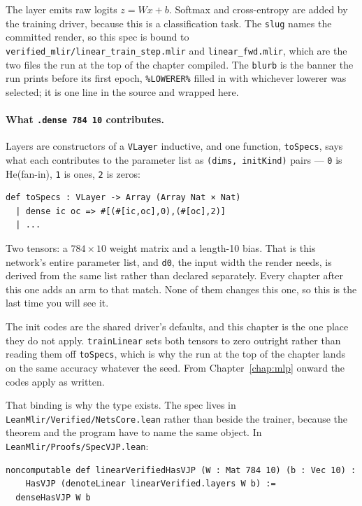The layer emits raw logits \(z = W x + b\). Softmax and cross-entropy
are added by the training driver, because this is a classification
task. The \texttt{slug} names the committed render, so this spec is
bound to \texttt{verified\_mlir/linear\_train\_step.mlir} and
\texttt{linear\_fwd.mlir}, which are the two files the run at the top of
the chapter compiled. The \texttt{blurb} is the banner the run prints
before its first epoch, \texttt{\%LOWERER\%} filled in with whichever
lowerer was selected; it is one line in the source and wrapped here.

\paragraph{What \texttt{.dense 784 10} contributes.} Layers are
constructors of a \texttt{VLayer} inductive, and one function,
\texttt{toSpecs}, says what each contributes to the parameter list as
\texttt{(dims, initKind)} pairs --- \texttt{0} is He(fan-in), \texttt{1}
is ones, \texttt{2} is zeros:

\begin{verbatim}
def toSpecs : VLayer -> Array (Array Nat × Nat)
  | dense ic oc => #[(#[ic,oc],0),(#[oc],2)]
  | ...
\end{verbatim}

\noindent Two tensors: a $784 \times 10$ weight matrix and a length-10
bias. That is this network's entire parameter list, and \texttt{d0}, the
input width the render needs, is derived from the same list rather than
declared separately. Every chapter after this one adds an arm to that
match. None of them changes this one, so this is the last time you will
see it.

The init codes are the shared driver's defaults, and this chapter is the
one place they do not apply. \texttt{trainLinear} sets both tensors to
zero outright rather than reading them off \texttt{toSpecs}, which is why
the run at the top of the chapter lands on the same accuracy whatever the
seed. From Chapter~\ref{chap:mlp} onward the codes apply as written.

That binding is why the type exists. The spec lives in
\texttt{LeanMlir/Verified/NetsCore.lean} rather than beside the trainer,
because the theorem and the program have to name the same object. In
\texttt{LeanMlir/Proofs/SpecVJP.lean}:

\begin{verbatim}
noncomputable def linearVerifiedHasVJP (W : Mat 784 10) (b : Vec 10) :
    HasVJP (denoteLinear linearVerified.layers W b) :=
  denseHasVJP W b
\end{verbatim}

